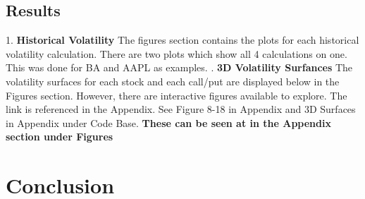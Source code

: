 \documentclass{article}
\begin{document}
\subsection{Results}
\begin{flushleft}
1. \textbf{Historical Volatility} \newline 
The figures section contains the plots for each historical volatility calculation. There are two plots which show all 4 calculations on one. This was done for BA and AAPL as examples. \newline{}. \textbf{3D Volatility Surfances} The volatility surfaces for each stock and each call/put are displayed below in the Figures section. However, there are interactive figures available to explore. The link is referenced in the Appendix.  See Figure 8-18 in Appendix and 3D Surfaces in Appendix under Code Base. 
\newline\newline
\textbf{These can be seen at in the Appendix section under Figures}
\end{flushleft}
\newpage

\section{Conclusion}
\end{document}
